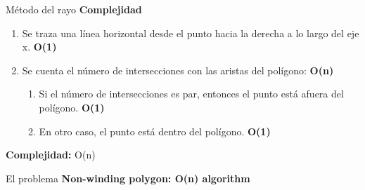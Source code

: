 \documentclass[aspectratio=169,xcolor=dvipsnames, t]{beamer}
\begin{document}
\begin{frame}[c]{Método del rayo}
  \textbf{Complejidad}
  \begin{enumerate}
  \item Se traza una línea horizontal desde el punto hacia la derecha a lo largo del eje x. \textbf{O(1)}
  \item Se cuenta el número de intersecciones con las aristas del polígono:  \textbf{O(n)}
    \begin{enumerate}
    \item Si el número de intersecciones es par, entonces el punto está afuera del polígono.  \textbf{O(1)}
    \item En otro caso, el punto está dentro del polígono.  \textbf{O(1)}
    \end{enumerate}
  \end{enumerate}

  \textbf{Complejidad:} O(n)
\end{frame}


\begin{frame}{El problema}
  \textbf{Non-winding polygon: O(n) algorithm}\\
  \vspace{0.5cm}
\end{frame}

\end{document}
